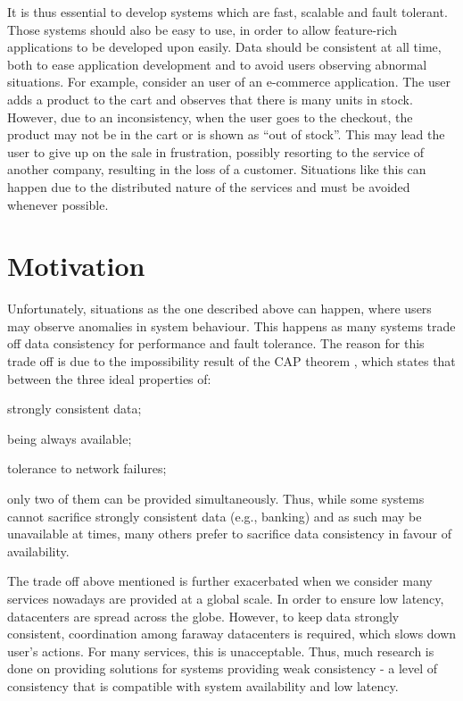 It is thus essential to develop systems which are fast, scalable and fault tolerant.
Those systems should also be easy to use, in order to allow feature-rich applications to be developed upon easily.
Data should be consistent at all time, both to ease application development and to avoid users observing abnormal situations.
For example, consider an user of an e-commerce application.
The user adds a product to the cart and observes that there is many units in stock.
However, due to an inconsistency, when the user goes to the checkout, the product may not be in the cart or is shown as ``out of stock''.
This may lead the user to give up on the sale in frustration, possibly resorting to the service of another company, resulting in the loss of a customer.
Situations like this can happen due to the distributed nature of the services and must be avoided whenever possible.

\section{Motivation}
Unfortunately, situations as the one described above can happen, where users may observe anomalies in system behaviour.
This happens as many systems trade off data consistency for performance and fault tolerance.
The reason for this trade off is due to the impossibility result of the CAP theorem \cite{cap}, which states that between the three ideal properties of:
\begin{enumerate*}[label=(\roman*)]
	\item strongly consistent data;
	\item being always available;
	\item tolerance to network failures;
\end{enumerate*}
only two of them can be provided simultaneously.
Thus, while some systems cannot sacrifice strongly consistent data (e.g., banking) and as such may be unavailable at times, many others prefer to sacrifice data consistency in favour of availability.

The trade off above mentioned is further exacerbated when we consider many services nowadays are provided at a global scale.
In order to ensure low latency, datacenters are spread across the globe.
However, to keep data strongly consistent, coordination among faraway datacenters is required, which slows down user's actions.
For many services, this is unacceptable.
Thus, much research is done on providing solutions for systems providing weak consistency \cite{???} - a level of consistency that is compatible with system availability and low latency.

